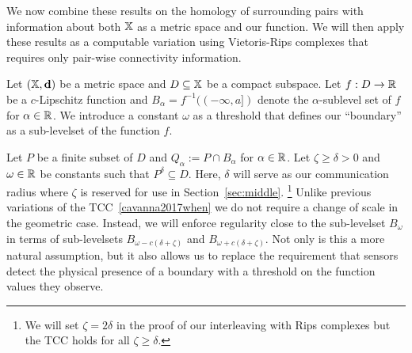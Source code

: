 

We now combine these results on the homology of surrounding pairs with information about both $\mathbb{X}$ as a metric space and our function.
We will then apply these results as a computable variation using Vietoris-Rips complexes that requires only pair-wise connectivity information.

Let $(\mathbb{X},\mathbf{d})$ be a metric space and $D\subseteq \mathbb{X}$ be a compact subspace.
Let $f : D\to \mathbb{R}$ be a $c$-Lipschitz function and $B_\alpha = f^{-1}((-\infty, a])$ denote the $\alpha$-sublevel set of $f$ for $\alpha\in\mathbb{R}$.
We introduce a constant $\omega$ as a threshold that defines our ``boundary'' as a sub-levelset of the function $f$.

Let $P$ be a finite subset of $D$ and $Q_\alpha := P\cap B_\alpha$ for $\alpha\in\mathbb{R}$.
Let $\zeta\geq\delta > 0 $ and $\omega\in \mathbb{R}$ be constants such that $P^\delta\subseteq D$.
Here, $\delta$ will serve as our communication radius where $\zeta$ is reserved for use in Section~\ref{sec:middle}.
  \footnote{We will set $\zeta = 2\delta$ in the proof of our interleaving with Rips complexes but the TCC holds for all $\zeta\geq\delta$.}
Unlike previous variations of the TCC~\ref{cavanna2017when} we do not require a change of scale in the geometric case.
Instead, we will enforce regularity close to the sub-levelset $B_\omega$ in terms of sub-levelsets $B_{\omega-c(\delta+\zeta)}$ and $B_{\omega+c(\delta+\zeta)}$.
Not only is this a more natural assumption, but it also allows us to replace the requirement that sensors detect the physical presence of a boundary with a threshold on the function values they observe.

